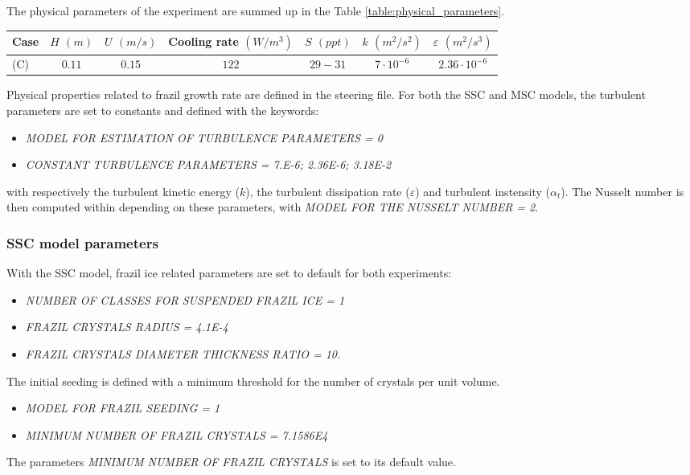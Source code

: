 The physical parameters of the experiment are summed up in the Table \ref{table:physical_parameters}.
\begin{center}
\begin{tabular}{lcccccc}
\hline
Case & $H$ $(m)$ & $U$ $(m/s)$ & Cooling rate $(W/m^3)$ & $S$ $(ppt)$ & $k$ $(m^2/s^2)$ & $\varepsilon$ $(m^2/s^3)$ \\
\hline \hline
(C) & $0.11$ & $0.15$ & $122$ & $29-31$ & $7 \cdot 10^{-6}$ & $2.36 \cdot 10^{-6}$ \\
\hline
\end{tabular}
\label{table:physical_parameters}
\end{center}

Physical properties related to frazil growth rate are defined in the \khione steering file. 
For both the SSC and MSC models, the turbulent parameters are set to constants
and defined with the keywords:
\begin{itemize}
	\item\textit{MODEL FOR ESTIMATION OF TURBULENCE PARAMETERS = 0}
	\item\textit{CONSTANT TURBULENCE PARAMETERS = 7.E-6; 2.36E-6; 3.18E-2}
\end{itemize}
with respectively the turbulent kinetic energy ($k$),
the turbulent dissipation rate ($\varepsilon$) and 
turbulent instensity ($\alpha_t$).
The Nusselt number is then computed within \khione depending on these parameters, 
with \textit{MODEL FOR THE NUSSELT NUMBER = 2}.

\subsubsection{SSC model parameters}
With the SSC model, frazil ice related parameters are set to default 
for both experiments:
\begin{itemize}
	\item\textit{NUMBER OF CLASSES FOR SUSPENDED FRAZIL ICE = 1}
	\item\textit{FRAZIL CRYSTALS RADIUS = 4.1E-4}
	\item\textit{FRAZIL CRYSTALS DIAMETER THICKNESS RATIO = 10.}
\end{itemize}

The initial seeding is defined with a minimum threshold for the number of crystals per unit volume.
\begin{itemize}
  \item\textit{MODEL FOR FRAZIL SEEDING = 1}
  \item\textit{MINIMUM NUMBER OF FRAZIL CRYSTALS = 7.1586E4}
\end{itemize}
The parameters \textit{MINIMUM NUMBER OF FRAZIL CRYSTALS} is set to its default value.

